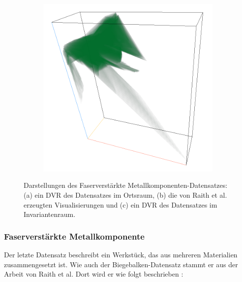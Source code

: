 \documentclass[a4paper,fontsize=12pt,toc=bib,halfparskip,ngerman]{scrartcl}
\begin{document}
\begin{figure}
\begin{subfigure}{0.45\textwidth}
		\subcaption{}
		\label{NodelRaith}
	\end{subfigure}	
	\hspace*{\fill}
	\begin{subfigure}{0.3\textwidth}
		\centering
		\includegraphics[width=\textwidth]{pictures/results/Nodel/Nodel_InvariantSpace.png}
		\subcaption{}
		\label{NodelInvariant}
	\end{subfigure}
	\caption{Darstellungen des Faserverst\"arkte Metallkomponenten-Datensatzes: (a) ein DVR des Datensatzes im Ortsraum, (b) die von Raith et al. erzeugten Visualisierungen und (c) ein DVR des Datensatzes im Invariantenraum.}
	\label{Nodel}
\end{figure}

\subsubsection{Faserverst\"arkte Metallkomponente}
Der letzte Datensatz beschreibt ein Werkst\"uck, das aus mehreren Materialien zusammengesetzt ist. Wie auch der Biegebalken-Datensatz stammt er aus der Arbeit von Raith et al. Dort wird er wie folgt beschrieben \cite[S.~1129]{raith2019tensor}:
\end{document}
